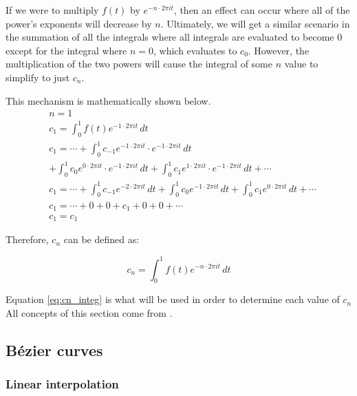 \documentclass[letterpaper, 12pt]{article}
\begin{document}
If we were to multiply \(f(t)\) by \(e^{-n \cdot 2\pi it}\), then an effect can occur
where all of the power's exponents will decrease by \(n\). Ultimately, we will
get a similar scenario in the summation of all the integrals where
all integrals are evaluated to become 0 except for the integral
where \(n = 0\), which evaluates to \(c_0\). However, the multiplication
of the two powers will cause the integral of some \(n\) value to simplify to just
\(c_n\).

This mechanism is mathematically shown below.
\begin{align*}
     & n = 1
    \\
     & c_1 = \int_{0}^{1} f(t) e^{-1 \cdot 2\pi it} \,dt
    \\
     & c_1 = \cdots + \int_{0}^{1} c_{-1} e^{-1 \cdot 2\pi it} \cdot e^{-1 \cdot 2\pi it} \,dt
    \\
     & + \int_{0}^{1} c_{0} e^{0 \cdot 2\pi it} \cdot e^{-1 \cdot 2\pi it} \,dt + \int_{0}^{1} c_{1} e^{1 \cdot 2\pi it} \cdot e^{-1 \cdot 2\pi it} \,dt + \cdots
    \\
     & c_1 = \cdots + \int_{0}^{1} c_{-1} e^{-2 \cdot 2\pi it} \,dt + \int_{0}^{1} c_{0} e^{-1 \cdot 2\pi it} \,dt + \int_{0}^{1} c_{1} e^{0 \cdot 2\pi it} \,dt + \cdots
    \\
     & c_1 = \cdots + 0 + 0 + c_1 + 0 + 0 + \cdots
    \\
     & c_1 = c_1
\end{align*}

Therefore, \(c_n\) can be defined as:

\begin{equation}
    c_n = \int_{0}^{1} f(t) e^{-n \cdot 2\pi it} \,dt
    \label{eq:cn_integ}
\end{equation}

Equation \ref*{eq:cn_integ} is what will be used in order to
determine each value of \(c_n\)
\\

All concepts of this section come from \cite{sandersonWhatFourierSeries2019}.


\subsection{Bézier curves}

\subsubsection{Linear interpolation}
\end{document}
